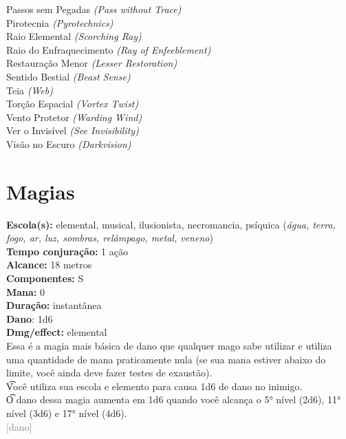 \documentclass{RPG_Adventure}[2021/10/20]
\begin{document}
{\normalsize Passos sem Pegadas \textit{(Pass without Trace)}\\ }
{\normalsize Pirotecnia \textit{(Pyrotechnics)}\\ }
{\normalsize Raio Elemental \textit{(Scorching Ray)}\\ }
{\normalsize Raio do Enfraquecimento \textit{(Ray of Enfeeblement)}\\ }
{\normalsize Restauração Menor \textit{(Lesser Restoration)}\\ }
{\normalsize Sentido Bestial \textit{(Beast Sense)}\\ }
{\normalsize Teia \textit{(Web)}\\ }
{\normalsize Torção Espacial \textit{(Vortex Twist)}\\ }
{\normalsize Vento Protetor \textit{(Warding Wind)}\\ }
{\normalsize Ver o Invisível \textit{(See Invisibility)}\\ }
{\normalsize Visão no Escuro \textit{(Darkvision)}\\ }
\jump\chapter{Magias}\n\n{}
{\small \t \textbf{Escola(s):} elemental, musical, ilusionista, necromancia, psíquica (\textit{água, terra, fogo, ar, luz, sombras, relâmpago, metal, veneno})\\\t \textbf{Tempo conjuração:} 1 ação\\\t \textbf{Alcance:} 18 metros\\\t \textbf{Componentes:} S\\\t \textbf{Mana:} 0\\\t \textbf{Duração:} instantânea\\\t \textbf{Dano}: 1d6\\\t \textbf{Dmg/effect:} elemental\\}
{\normalsize Essa é a magia mais básica de dano que qualquer mago sabe utilizar e utiliza uma quantidade de mana praticamente nula (se sua mana estiver abaixo do limite, você ainda deve fazer testes de exaustão).\\\t Você utiliza sua escola e elemento para causa 1d6 de dano no inimigo.\\\t O dano dessa magia aumenta em 1d6 quando você alcança o 5° nível (2d6), 11° nível (3d6) e 17° nível (4d6).\\}
{\scriptsize \textcolor{gray}{[dano]\\}}
\end{document}
